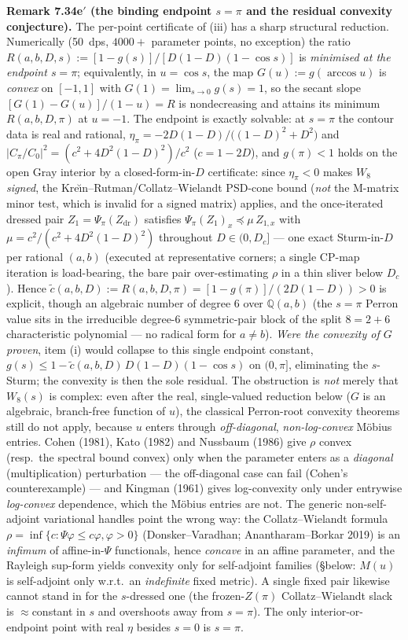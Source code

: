 \documentclass[
]{article}
\begin{document}
\textbf{Remark 7.34e$'$ (the binding endpoint $s=\pi$ and the residual
convexity conjecture).} The per-point certificate of (iii) has a sharp
structural reduction. Numerically (50~dps, $4000+$ parameter points, no
exception) the ratio $R(a,b,D,s):=[1-g(s)]/[D(1-D)(1-\cos s)]$ is
\emph{minimised at the endpoint $s=\pi$}; equivalently, in $u=\cos s$, the
map $G(u):=g(\arccos u)$ is \emph{convex} on $[-1,1]$ with
$G(1)=\lim_{s\to0}g(s)=1$, so the secant slope
$[G(1)-G(u)]/(1-u)=R$ is nondecreasing and attains its minimum
$R(a,b,D,\pi)$ at $u=-1$. The endpoint is exactly solvable: at $s=\pi$ the
contour data is real and rational,
$\eta_\pi=-2D(1-D)/\bigl((1-D)^2+D^2\bigr)$ and
$|C_\pi/C_0|^2=(c^2+4D^2(1-D)^2)/c^2$ ($c=1-2D$), and $g(\pi)<1$ holds on the
open Gray interior by a closed-form-in-$D$ certificate: since $\eta_\pi<0$
makes $W_8$ \emph{signed}, the Kre\u{\i}n--Rutman/Collatz--Wielandt PSD-cone
bound (\emph{not} the M-matrix minor test, which is invalid for a signed
matrix) applies, and the once-iterated dressed pair $Z_1=\Psi_\pi(Z_{\mathrm
{dr}})$ satisfies $\Psi_\pi(Z_1)_x\preceq\mu\,Z_{1,x}$ with
$\mu=c^2/(c^2+4D^2(1-D)^2)$ throughout $D\in(0,D_c]$ --- one exact
Sturm-in-$D$ per rational $(a,b)$ (executed at representative corners; a
single CP-map iteration is load-bearing, the bare pair over-estimating
$\rho$ in a thin sliver below $D_c$). Hence
$\tilde c(a,b,D):=R(a,b,D,\pi)=[1-g(\pi)]/(2D(1-D))>0$ is explicit, though an
algebraic number of degree $6$ over $\mathbb Q(a,b)$ (the $s=\pi$ Perron
value sits in the irreducible degree-$6$ symmetric-pair block of the split
$8=2{+}6$ characteristic polynomial --- no radical form for $a\ne b$).
\emph{Were the convexity of $G$ proven}, item (i) would collapse to this
single endpoint constant, $g(s)\le1-\tilde c(a,b,D)\,D(1-D)(1-\cos s)$ on
$(0,\pi]$, eliminating the $s$-Sturm; the convexity is then the sole
residual. The obstruction is \emph{not} merely that $W_8(s)$ is complex: even
after the real, single-valued reduction below ($G$ is an algebraic, branch-free
function of $u$), the classical Perron-root convexity theorems still do not
apply, because $u$ enters through \emph{off-diagonal}, \emph{non-log-convex}
M\"obius entries. Cohen (1981), Kato (1982) and Nussbaum (1986) give $\rho$
convex (resp.\ the spectral bound convex) only when the parameter enters as a
\emph{diagonal} (multiplication) perturbation --- the off-diagonal case can
fail (Cohen's counterexample) --- and Kingman (1961) gives log-convexity only
under entrywise \emph{log-convex} dependence, which the M\"obius entries are
not. The generic non-self-adjoint variational handles point the wrong way: the
Collatz--Wielandt formula $\rho=\inf\{c:\Psi\varphi\le c\varphi,\varphi>0\}$
(Donsker--Varadhan; Anantharam--Borkar 2019) is an \emph{infimum} of
affine-in-$\Psi$ functionals, hence \emph{concave} in an affine parameter, and
the Rayleigh sup-form yields convexity only for self-adjoint families (\S below:
$M(u)$ is self-adjoint only w.r.t.\ an \emph{indefinite} fixed metric). A
single fixed pair likewise cannot stand in for the $s$-dressed one (the
frozen-$Z(\pi)$ Collatz--Wielandt slack is $\approx$constant in $s$ and
overshoots away from $s=\pi$). The only interior-or-endpoint point with real
$\eta$ besides $s=0$ is $s=\pi$.
\end{document}
